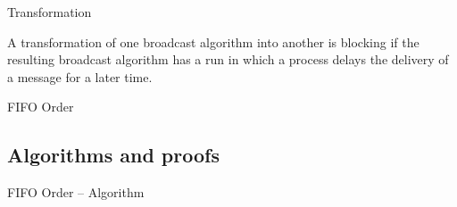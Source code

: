 \begin{frame}{Transformation}
	
\begin{definition}
A transformation of one broadcast algorithm into another is \alert{blocking}
if the resulting broadcast algorithm has a run in which a process delays the
delivery of a message for a later time.
\end{definition}

\begin{example}
FIFO Order
\end{example}

\end{frame}

\subsection{Algorithms and proofs}

\begin{frame}[shrink=12]{FIFO Order -- Algorithm}

\begin{Procedure}
\caption{FIFO Order Transformation executed by process $p$}

\BlankLine
{}
\BlankLine
{}
\end{Procedure}

\end{frame}


